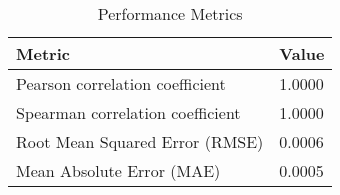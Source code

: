 \documentclass{article}
\begin{document}
\begin{table}[h!]
\centering
\begin{tabular}{ll}
\toprule
Metric & Value \\
\midrule
Pearson correlation coefficient & 1.0000 \\
Spearman correlation coefficient & 1.0000 \\
Root Mean Squared Error (RMSE) & 0.0006 \\
Mean Absolute Error (MAE) & 0.0005 \\
\bottomrule
\end{tabular}
\caption{Performance Metrics}
\label{tab:metrics}
\end{table}
\end{document}
